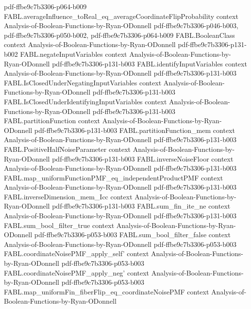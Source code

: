 \begin{theorem}
{    pdf-ffbe9c7b3306-p064-b009}
\proofstep
  {FABL.averageInfluence_toReal_eq_averageCoordinateFlipProbability}
  {context}
  {Analysis-of-Boolean-Functions-by-Ryan-ODonnell}
  {pdf-ffbe9c7b3306-p046-b003,
    pdf-ffbe9c7b3306-p050-b002,
    pdf-ffbe9c7b3306-p064-b009}
\proofstep
  {FABL.BooleanClass}
  {context}
  {Analysis-of-Boolean-Functions-by-Ryan-ODonnell}
  {pdf-ffbe9c7b3306-p131-b002}
\proofstep
  {FABL.negateInputVariables}
  {context}
  {Analysis-of-Boolean-Functions-by-Ryan-ODonnell}
  {pdf-ffbe9c7b3306-p131-b003}
\proofstep
  {FABL.identifyInputVariables}
  {context}
  {Analysis-of-Boolean-Functions-by-Ryan-ODonnell}
  {pdf-ffbe9c7b3306-p131-b003}
\proofstep
  {FABL.IsClosedUnderNegatingInputVariables}
  {context}
  {Analysis-of-Boolean-Functions-by-Ryan-ODonnell}
  {pdf-ffbe9c7b3306-p131-b003}
\proofstep
  {FABL.IsClosedUnderIdentifyingInputVariables}
  {context}
  {Analysis-of-Boolean-Functions-by-Ryan-ODonnell}
  {pdf-ffbe9c7b3306-p131-b003}
\proofstep
  {FABL.partitionFunction}
  {context}
  {Analysis-of-Boolean-Functions-by-Ryan-ODonnell}
  {pdf-ffbe9c7b3306-p131-b003}
\proofstep
  {FABL.partitionFunction_mem}
  {context}
  {Analysis-of-Boolean-Functions-by-Ryan-ODonnell}
  {pdf-ffbe9c7b3306-p131-b003}
\proofstep
  {FABL.PositiveHalfNoiseParameter}
  {context}
  {Analysis-of-Boolean-Functions-by-Ryan-ODonnell}
  {pdf-ffbe9c7b3306-p131-b003}
\proofstep
  {FABL.inverseNoiseFloor}
  {context}
  {Analysis-of-Boolean-Functions-by-Ryan-ODonnell}
  {pdf-ffbe9c7b3306-p131-b003}
\proofstep
  {FABL.map_uniformFunctionPMF_eq_independentProductPMF}
  {context}
  {Analysis-of-Boolean-Functions-by-Ryan-ODonnell}
  {pdf-ffbe9c7b3306-p131-b003}
\proofstep
  {FABL.inverseDimension_mem_Icc}
  {context}
  {Analysis-of-Boolean-Functions-by-Ryan-ODonnell}
  {pdf-ffbe9c7b3306-p131-b003}
\proofstep
  {FABL.sum_fin_ite_ne}
  {context}
  {Analysis-of-Boolean-Functions-by-Ryan-ODonnell}
  {pdf-ffbe9c7b3306-p131-b003}
\proofstep
  {FABL.sum_bool_filter_true}
  {context}
  {Analysis-of-Boolean-Functions-by-Ryan-ODonnell}
  {pdf-ffbe9c7b3306-p053-b003}
\proofstep
  {FABL.sum_bool_filter_false}
  {context}
  {Analysis-of-Boolean-Functions-by-Ryan-ODonnell}
  {pdf-ffbe9c7b3306-p053-b003}
\proofstep
  {FABL.coordinateNoisePMF_apply_self'}
  {context}
  {Analysis-of-Boolean-Functions-by-Ryan-ODonnell}
  {pdf-ffbe9c7b3306-p053-b003}
\proofstep
  {FABL.coordinateNoisePMF_apply_neg'}
  {context}
  {Analysis-of-Boolean-Functions-by-Ryan-ODonnell}
  {pdf-ffbe9c7b3306-p053-b003}
\proofstep
  {FABL.map_uniformFin_fiberFlip_eq_coordinateNoisePMF}
  {context}
  {Analysis-of-Boolean-Functions-by-Ryan-ODonnell}

\end{theorem}
